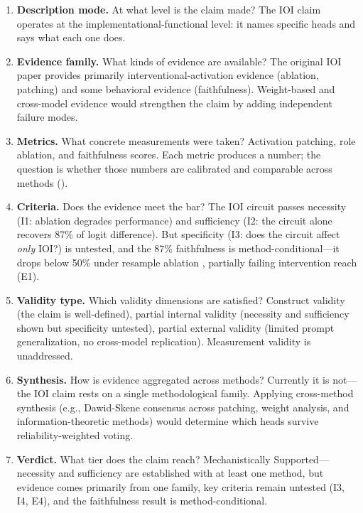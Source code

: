 \documentclass{article}
\begin{document}
\begin{enumerate}[nosep]
\item \textbf{Description mode.} At what level is the claim made? The IOI claim operates at the implementational-functional level: it names specific heads and says what each one does.

\item \textbf{Evidence family.} What kinds of evidence are available? The original IOI paper provides primarily interventional-activation evidence (ablation, patching) and some behavioral evidence (faithfulness). Weight-based and cross-model evidence would strengthen the claim by adding independent failure modes.

\item \textbf{Metrics.} What concrete measurements were taken? Activation patching, role ablation, and faithfulness scores. Each metric produces a number; the question is whether those numbers are calibrated and comparable across methods ().

\item \textbf{Criteria.} Does the evidence meet the bar? The IOI circuit passes necessity (I1: ablation degrades performance) and sufficiency (I2: the circuit alone recovers 87\% of logit difference). But specificity (I3: does the circuit affect \emph{only} IOI?) is untested, and the 87\% faithfulness is method-conditional---it drops below 50\% under resample ablation \citep{miller2024transformer}, partially failing intervention reach (E1).

\item \textbf{Validity type.} Which validity dimensions are satisfied? Construct validity (the claim is well-defined), partial internal validity (necessity and sufficiency shown but specificity untested), partial external validity (limited prompt generalization, no cross-model replication). Measurement validity is unaddressed.

\item \textbf{Synthesis.} How is evidence aggregated across methods? Currently it is not---the IOI claim rests on a single methodological family. Applying cross-method synthesis (e.g., Dawid-Skene consensus across patching, weight analysis, and information-theoretic methods) would determine which heads survive reliability-weighted voting.

\item \textbf{Verdict.} What tier does the claim reach? Mechanistically Supported---necessity and sufficiency are established with at least one method, but evidence comes primarily from one family, key criteria remain untested (I3, I4, E4), and the faithfulness result is method-conditional.
\end{enumerate}
\end{document}
